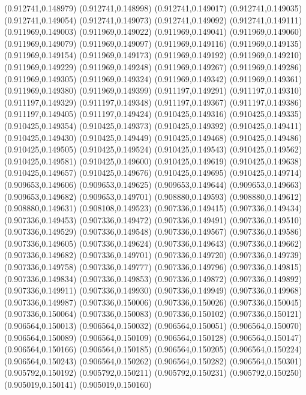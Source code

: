 (0.912741,0.148979)
(0.912741,0.148998)
(0.912741,0.149017)
(0.912741,0.149035)
(0.912741,0.149054)
(0.912741,0.149073)
(0.912741,0.149092)
(0.912741,0.149111)
(0.911969,0.149003)
(0.911969,0.149022)
(0.911969,0.149041)
(0.911969,0.149060)
(0.911969,0.149079)
(0.911969,0.149097)
(0.911969,0.149116)
(0.911969,0.149135)
(0.911969,0.149154)
(0.911969,0.149173)
(0.911969,0.149192)
(0.911969,0.149210)
(0.911969,0.149229)
(0.911969,0.149248)
(0.911969,0.149267)
(0.911969,0.149286)
(0.911969,0.149305)
(0.911969,0.149324)
(0.911969,0.149342)
(0.911969,0.149361)
(0.911969,0.149380)
(0.911969,0.149399)
(0.911197,0.149291)
(0.911197,0.149310)
(0.911197,0.149329)
(0.911197,0.149348)
(0.911197,0.149367)
(0.911197,0.149386)
(0.911197,0.149405)
(0.911197,0.149424)
(0.910425,0.149316)
(0.910425,0.149335)
(0.910425,0.149354)
(0.910425,0.149373)
(0.910425,0.149392)
(0.910425,0.149411)
(0.910425,0.149430)
(0.910425,0.149449)
(0.910425,0.149468)
(0.910425,0.149486)
(0.910425,0.149505)
(0.910425,0.149524)
(0.910425,0.149543)
(0.910425,0.149562)
(0.910425,0.149581)
(0.910425,0.149600)
(0.910425,0.149619)
(0.910425,0.149638)
(0.910425,0.149657)
(0.910425,0.149676)
(0.910425,0.149695)
(0.910425,0.149714)
(0.909653,0.149606)
(0.909653,0.149625)
(0.909653,0.149644)
(0.909653,0.149663)
(0.909653,0.149682)
(0.909653,0.149701)
(0.908880,0.149593)
(0.908880,0.149612)
(0.908880,0.149631)
(0.908108,0.149523)
(0.907336,0.149415)
(0.907336,0.149434)
(0.907336,0.149453)
(0.907336,0.149472)
(0.907336,0.149491)
(0.907336,0.149510)
(0.907336,0.149529)
(0.907336,0.149548)
(0.907336,0.149567)
(0.907336,0.149586)
(0.907336,0.149605)
(0.907336,0.149624)
(0.907336,0.149643)
(0.907336,0.149662)
(0.907336,0.149682)
(0.907336,0.149701)
(0.907336,0.149720)
(0.907336,0.149739)
(0.907336,0.149758)
(0.907336,0.149777)
(0.907336,0.149796)
(0.907336,0.149815)
(0.907336,0.149834)
(0.907336,0.149853)
(0.907336,0.149872)
(0.907336,0.149892)
(0.907336,0.149911)
(0.907336,0.149930)
(0.907336,0.149949)
(0.907336,0.149968)
(0.907336,0.149987)
(0.907336,0.150006)
(0.907336,0.150026)
(0.907336,0.150045)
(0.907336,0.150064)
(0.907336,0.150083)
(0.907336,0.150102)
(0.907336,0.150121)
(0.906564,0.150013)
(0.906564,0.150032)
(0.906564,0.150051)
(0.906564,0.150070)
(0.906564,0.150089)
(0.906564,0.150109)
(0.906564,0.150128)
(0.906564,0.150147)
(0.906564,0.150166)
(0.906564,0.150185)
(0.906564,0.150205)
(0.906564,0.150224)
(0.906564,0.150243)
(0.906564,0.150262)
(0.906564,0.150282)
(0.906564,0.150301)
(0.905792,0.150192)
(0.905792,0.150211)
(0.905792,0.150231)
(0.905792,0.150250)
(0.905019,0.150141)
(0.905019,0.150160)
